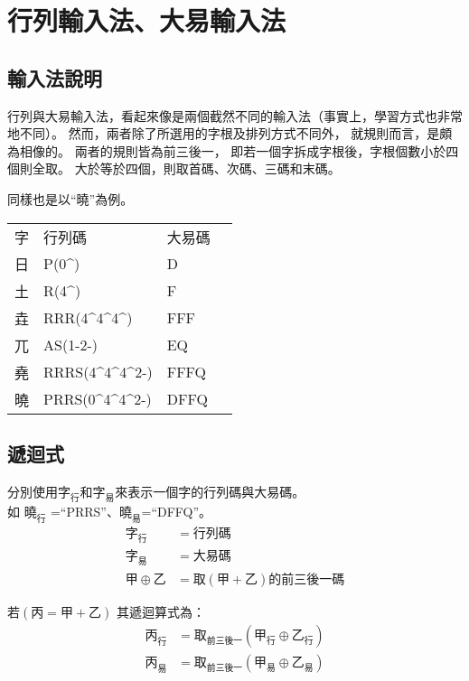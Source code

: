 \documentclass{article}
\def\tac{\textasciicircum}
\newcommand\qhchar[1]{\mbox{#1}}
\newcommand\qhar[1]{\qhchar{#1}_{\mbox{行}}}
\newcommand\qharrule{\mbox{取}_{\mbox{前三後一}}}
\newcommand\qhdy[1]{\qhchar{#1}_{\mbox{易}}}
\newcommand\qhdyrule{\mbox{取}_{\mbox{前三後一}}}
\begin{document}
\section{行列輸入法、大易輸入法}
\subsection{輸入法說明}
行列與大易輸入法，看起來像是兩個截然不同的輸入法（事實上，學習方式也非常地不同）。%
然而，兩者除了所選用的字根及排列方式不同外，
就規則而言，是頗為相像的。
兩者的規則皆為前三後一，
即若一個字拆成字根後，字根個數小於四個則全取。
大於等於四個，則取首碼、次碼、三碼和末碼。

同樣也是以``曉''為例。\\
\begin{tabular}{llll}
字  & 行列碼 & 大易碼\\
日  & P(0\tac) & D\\
土  & R(4\tac) & F\\
垚  & RRR(4\tac4\tac4\tac) & FFF\\
兀  & AS(1-2-) & EQ\\
堯  & RRRS(4\tac4\tac4\tac2-) & FFFQ\\
曉  & PRRS(0\tac4\tac4\tac2-) & DFFQ\\
\end{tabular}

\subsection{遞迴式}
分別使用$\qhar{字}$和$\qhdy{字}$來表示一個字的行列碼與大易碼。\\
如 $\qhar{曉}$ =``PRRS''、$\qhdy{曉}$=``DFFQ''。
\begin{subequations}
  \begin{align}
  \qhar{字} &= 行列碼\\
  \qhdy{字} &= 大易碼\\
  甲 \oplus 乙 &= 取(甲+乙)的前三後一碼
  \end{align}
\end{subequations}

若$(\qhchar{丙}=\qhchar{甲}+\qhchar{乙})$
其遞迴算式為：
\begin{subequations}
  \begin{align}
  \qhar{丙}&=\qharrule{}(\qhar{甲} \oplus \qhar{乙})\\
  \qhdy{丙}&=\qhdyrule{}(\qhdy{甲} \oplus \qhdy{乙})
  \end{align}
\end{subequations}
\end{document}
